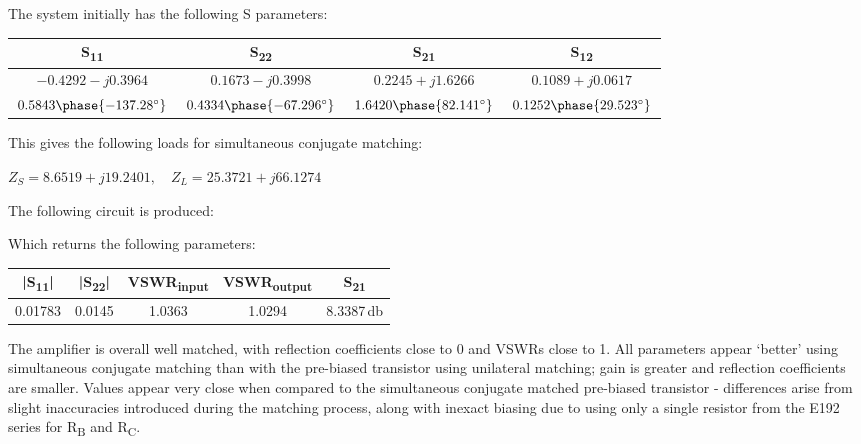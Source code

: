 \documentclass[12pt]{article}
\begin{document}
The system initially has the following S parameters:
\begin{center}
    \begin{tabular}{|c|c|c|c|}
        \hline
        S\textsubscript{11} & S\textsubscript{22} & S\textsubscript{21} & S\textsubscript{12} \\
        \hline  
        $-0.4292 - j0.3964$ & $0.1673 - j0.3998$ & $0.2245 + j1.6266$ & $0.1089 + j0.0617$ \\
        \hline
        $0.5843 \phase{-137.28^{\circ}}$& $0.4334 \phase{-67.296^{\circ}}$ & $1.6420 \phase{82.141^{\circ}}$&$0.1252 \phase{29.523^{\circ}}$  \\
        \hline
    \end{tabular}
\end{center}

This gives the following loads for simultaneous conjugate matching:

$Z_S = 8.6519 + j19.2401, \quad Z_L = 25.3721 + j66.1274$

The following circuit is produced:
\begin{center}
\end{center}

Which returns the following parameters:
\begin{center}
    \begin{tabular}{|c|c|c|c|c|}
        \hline
        |S\textsubscript{11}| & |S\textsubscript{22}| & VSWR\textsubscript{input} & VSWR\textsubscript{output} & S\textsubscript{21} \\
        \hline  
        0.01783 & 0.0145 &1.0363 & 1.0294 & 8.3387\,\unit{\decibel}\\
        \hline
    \end{tabular}
\end{center}

The amplifier is overall well matched, with reflection coefficients close to 0 and VSWRs close to 1. 
All parameters appear `better' using simultaneous conjugate matching than with the pre-biased transistor using 
unilateral matching; gain is greater and reflection coefficients are smaller. Values appear very close when 
compared to the simultaneous conjugate matched pre-biased transistor - differences arise from 
slight inaccuracies introduced during the matching process, along with inexact biasing due to using only a single resistor 
from the E192 series for R\textsubscript{B} and R\textsubscript{C}.
\end{document}
